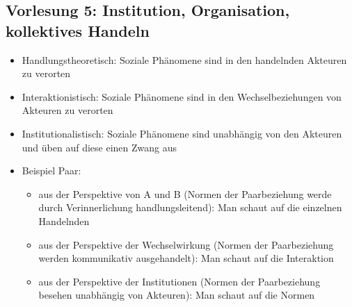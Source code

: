 \documentclass{scrartcl}
\begin{document}
\subsection*{Vorlesung 5: Institution, Organisation, kollektives Handeln}
\begin{itemize}
    \item
        Handlungstheoretisch: Soziale Phänomene sind in den handelnden Akteuren zu verorten
    \item
        Interaktionistisch: Soziale Phänomene sind in den Wechselbeziehungen von Akteuren zu verorten
    \item
        Institutionalistisch: Soziale Phänomene sind unabhängig von den Akteuren und üben auf diese einen Zwang aus
    \item
        Beispiel Paar:
        \begin{itemize}
            \item
                aus der Perspektive von A und B (Normen der Paarbeziehung werde durch Verinnerlichung handlungsleitend): Man schaut auf die einzelnen Handelnden
            \item
                aus der Perspektive der Wechselwirkung (Normen der Paarbeziehung werden kommunikativ ausgehandelt): Man schaut auf die Interaktion
            \item
                aus der Perspektive der Institutionen (Normen der Paarbeziehung besehen unabhängig von Akteuren): Man schaut auf die Normen
        \end{itemize}
\end{itemize}
\end{document}
